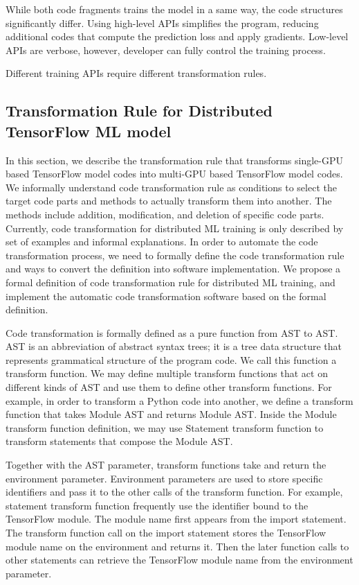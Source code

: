 While both code fragments trains the model in a same way, 
the code structures significantly differ.
Using high-level APIs simplifies the program,
reducing additional codes that compute the prediction loss and apply gradients.
Low-level APIs are verbose, however, developer can fully control
the training process.

Different training APIs require different transformation rules.


\subsection{Transformation Rule for Distributed TensorFlow ML model}

In this section, we describe the transformation rule that
transforms single-GPU based TensorFlow model codes into
multi-GPU based TensorFlow model codes.
We informally understand code transformation rule as
conditions to select the target code parts
and methods to actually transform them into another.
The methods include addition, modification, and deletion of
specific code parts.
Currently, code transformation for distributed ML training
is only described by set of examples and informal explanations.
In order to automate the code transformation process,
we need to formally define the code transformation rule
and ways to convert the definition into software implementation.
We propose a formal definition of code transformation rule
for distributed ML training, and implement the automatic code transformation
software based on the formal definition.

Code transformation is formally defined as a pure function from AST to AST.
AST is an abbreviation of abstract syntax trees; it is a tree data structure
that represents grammatical structure of the program code.
We call this function a transform function.
We may define multiple transform functions that act on different kinds
of AST and use them to define other transform functions.
For example, in order to transform a Python code into another,
we define a transform function that takes Module AST and returns Module AST.
Inside the Module transform function definition,
we may use Statement transform function to transform statements
that compose the Module AST.

Together with the AST parameter, transform functions take and return
the environment parameter.
Environment parameters are used to store specific identifiers
and pass it to the other calls of the transform function.
For example, statement transform function frequently use 
the identifier bound to the TensorFlow module.
The module name first appears from the import statement.
The transform function call on the import statement stores
the TensorFlow module name on the environment and returns it.
Then the later function calls to other statements can
retrieve the TensorFlow module name from the environment parameter.


